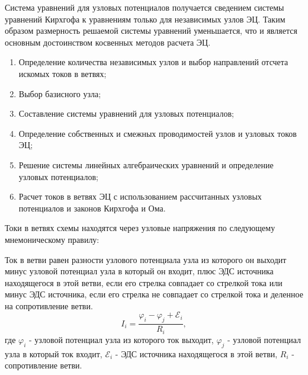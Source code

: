 Система уравнений для узловых потенциалов получается сведением системы уравнений Кирхгофа к уравнениям только для независимых узлов ЭЦ. Таким образом размерность решаемой системы уравнений уменьшается, что и является основным достоинством косвенных методов расчета ЭЦ.

\begin{tcolorbox}[
    colframe=gray!60!black!50!black,
    title=Последовательность решения задач методом узловых потенциалов,
    fonttitle=\bfseries,
    arc=3pt,
    boxrule=1pt
]
\begin{enumerate}
    \item Определение количества независимых узлов и выбор направлений отсчета искомых токов в ветвях;
    \item Выбор базисного узла;
    \item Составление системы уравнений для узловых потенциалов;
    \item Определение собственных и смежных проводимостей узлов и узловых токов ЭЦ;
    \item Решение системы линейных алгебраических уравнений и определение узловых потенциалов;
    \item Расчет токов в ветвях ЭЦ с использованием рассчитанных узловых потенциалов и законов Кирхгофа и Ома.
\end{enumerate}
\end{tcolorbox}

Токи в ветвях схемы находятся через узловые напряжения по следующему мнемоническому правилу: 

Ток в ветви равен разности узлового потенциала узла из которого он выходит минус узловой потенциал узла в который он входит, плюс ЭДС источника находящегося в этой ветви, если его стрелка совпадает со стрелкой тока или минус ЭДС источника, если его стрелка не совпадает со стрелкой тока и деленное на сопротивление ветви.
\begin{equation}
    I_i = \frac{\varphi_i - \varphi_j + \mathcal{E}_i}{R_i},
    \label{eq:kirchhoff_laws_2_4}
\end{equation}
где $\varphi_i$ - узловой потенциал узла из которого ток выходит, $\varphi_j$ - узловой потенциал узла в который ток входит, $\mathcal{E}_i$ - ЭДС источника находящегося в этой ветви, $R_i$ - сопротивление ветви.


